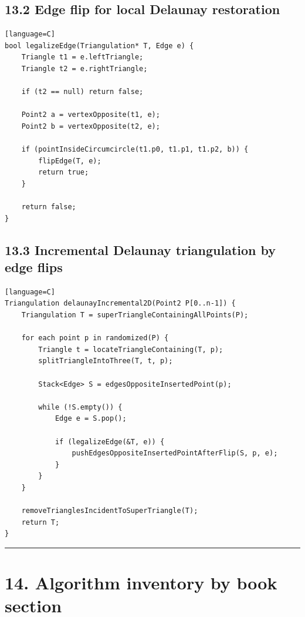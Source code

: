 \documentclass[11pt]{article}
\begin{document}
\subsection{13.2 Edge flip for local Delaunay
restoration}\label{edge-flip-for-local-delaunay-restoration}

\begin{verbatim}[language=C]
bool legalizeEdge(Triangulation* T, Edge e) {
    Triangle t1 = e.leftTriangle;
    Triangle t2 = e.rightTriangle;

    if (t2 == null) return false;

    Point2 a = vertexOpposite(t1, e);
    Point2 b = vertexOpposite(t2, e);

    if (pointInsideCircumcircle(t1.p0, t1.p1, t1.p2, b)) {
        flipEdge(T, e);
        return true;
    }

    return false;
}
\end{verbatim}

\subsection{13.3 Incremental Delaunay triangulation by edge
flips}\label{incremental-delaunay-triangulation-by-edge-flips}

\begin{verbatim}[language=C]
Triangulation delaunayIncremental2D(Point2 P[0..n-1]) {
    Triangulation T = superTriangleContainingAllPoints(P);

    for each point p in randomized(P) {
        Triangle t = locateTriangleContaining(T, p);
        splitTriangleIntoThree(T, t, p);

        Stack<Edge> S = edgesOppositeInsertedPoint(p);

        while (!S.empty()) {
            Edge e = S.pop();

            if (legalizeEdge(&T, e)) {
                pushEdgesOppositeInsertedPointAfterFlip(S, p, e);
            }
        }
    }

    removeTrianglesIncidentToSuperTriangle(T);
    return T;
}
\end{verbatim}

\begin{center}\rule{0.5\linewidth}{0.5pt}\end{center}

\section{14. Algorithm inventory by book
section}\label{algorithm-inventory-by-book-section}
\end{document}
